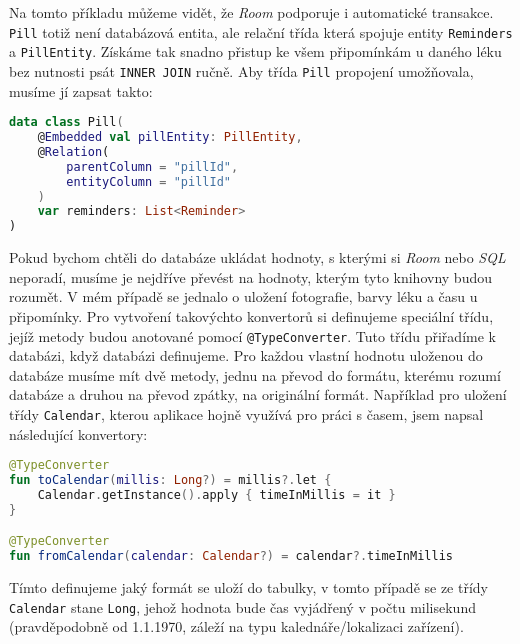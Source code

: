 \documentclass[../TakeYourPill.tex]{subfiles}
\begin{document}
Na tomto příkladu můžeme vidět, že \textit{Room} podporuje i automatické transakce. \texttt{Pill} totiž není databázová entita, ale relační třída která spojuje entity \texttt{Reminders} a \texttt{PillEntity}. Získáme tak snadno přistup ke všem připomínkám u daného léku bez nutnosti psát \texttt{INNER JOIN} ručně. Aby třída \texttt{Pill} propojení umožňovala, musíme jí zapsat takto:

\setmonofont{JetBrains Mono}
\begin{lstlisting}[language=Kotlin]
data class Pill(
    @Embedded val pillEntity: PillEntity,
    @Relation(
        parentColumn = "pillId",
        entityColumn = "pillId"
    )
    var reminders: List<Reminder>
)
\end{lstlisting}
\setmonofont{Latin Modern Mono}

Pokud bychom chtěli do databáze ukládat hodnoty, s kterými si \textit{Room} nebo \textit{SQL} neporadí, musíme je nejdříve převést na hodnoty, kterým tyto knihovny budou rozumět. V mém případě se jednalo o uložení fotografie, barvy léku a času u připomínky. Pro vytvoření takovýchto konvertorů si definujeme speciální třídu, jejíž metody budou anotované pomocí \texttt{@TypeConverter}. Tuto třídu přiřadíme k databázi, když databázi definujeme. Pro každou vlastní hodnotu uloženou do databáze musíme mít dvě metody, jednu na převod do formátu, kterému rozumí databáze a druhou na převod zpátky, na originální formát. Například pro uložení třídy \texttt{Calendar}, kterou aplikace hojně využívá pro práci s časem, jsem napsal následující konvertory:

\begin{minipage}{\linewidth}
\setmonofont{JetBrains Mono}
\begin{lstlisting}[language=Kotlin]
@TypeConverter
fun toCalendar(millis: Long?) = millis?.let {
    Calendar.getInstance().apply { timeInMillis = it }
}

@TypeConverter
fun fromCalendar(calendar: Calendar?) = calendar?.timeInMillis
\end{lstlisting}
\setmonofont{Latin Modern Mono}
\end{minipage}

Tímto definujeme jaký formát se uloží do tabulky, v tomto případě se ze třídy \texttt{Calendar} stane \texttt{Long}, jehož hodnota bude čas vyjádřený v počtu milisekund (pravděpodobně od 1.1.1970, záleží na typu kalednáře/lokalizaci zařízení). 
\end{document}
